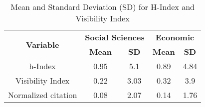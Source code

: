 \begin{table}[htbp]
\centering
\caption{Mean and Standard Deviation (SD) for H-Index and Visibility Index}
\label{tab:statistics}
\begin{tabular}{|c|c|c|c|c|}
\hline
\multirow{2}{*}{\textbf{Variable}} & \multicolumn{2}{c|}{\textbf{Social Sciences}} & \multicolumn{2}{c|}{\textbf{Economic}} \\
\cline{2-5}
 & \textbf{Mean} & \textbf{SD} & \textbf{Mean} & \textbf{SD} \\
\hline
h-Index & 0.95 & 5.1 & 0.89 & 4.84 \\
Visibility Index & 0.22 & 3.03 & 0.32 & 3.9 \\
Normalized citation & 0.08 & 2.07 & 0.14 & 1.76 \\
\hline
\end{tabular}
\end{table}